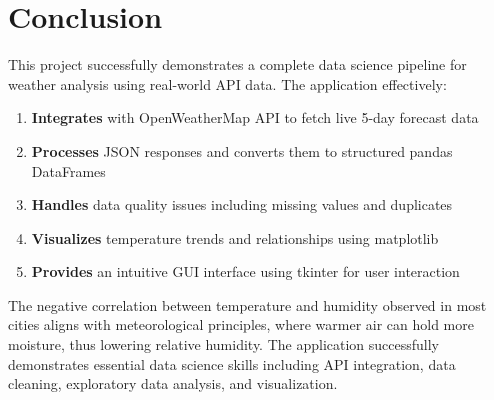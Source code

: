 \documentclass[a4paper]{article}
\begin{document}
\vspace{25pt}

\section*{Conclusion}

This project successfully demonstrates a complete data science pipeline for weather analysis using real-world API data. The application effectively:

\begin{enumerate}
    \item \textbf{Integrates} with OpenWeatherMap API to fetch live 5-day forecast data
    \item \textbf{Processes} JSON responses and converts them to structured pandas DataFrames
    \item \textbf{Handles} data quality issues including missing values and duplicates
    \item \textbf{Visualizes} temperature trends and relationships using matplotlib
    \item \textbf{Provides} an intuitive GUI interface using tkinter for user interaction
\end{enumerate}

The negative correlation between temperature and humidity observed in most cities aligns with meteorological principles, where warmer air can hold more moisture, thus lowering relative humidity. The application successfully demonstrates essential data science skills including API integration, data cleaning, exploratory data analysis, and visualization.
\end{document}
